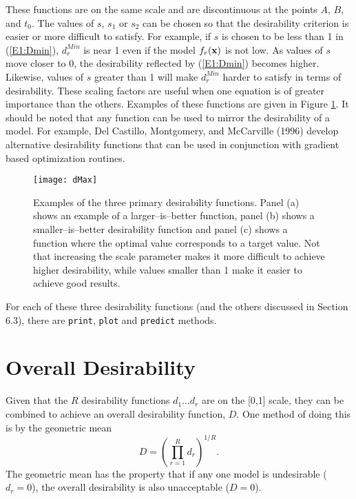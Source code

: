 \documentclass[12pt]{article}
\renewcommand{\vec}[1]{\mbox{\bf {#1}}}
\begin{document}
\noindent These functions are on the same scale and are discontinuous at the points $A$, $B$, and $t_0$. The values of $s$, $s_1$ or $s_2$ can be chosen so that the desirability criterion is easier or more difficult to satisfy. For example, if $s$ is chosen to be less than 1 in (\ref{E1:Dmin}), $d_r^{Min}$ is near 1 even if the model $f_r(\vec{x})$ is not low. As values of $s$ move closer to $0$, the desirability reflected by (\ref{E1:Dmin}) becomes higher. Likewise, values of $s$ greater than 1 will make $d_r^{Min}$ harder to satisfy in terms of desirability. These scaling factors are useful when one equation is of greater importance than the others. Examples of these functions are given in Figure \ref{F1:desire}. It should be noted that any function can be used to mirror the desirability of a model. For example, Del Castillo, Montgomery, and McCarville (1996) develop alternative desirability functions that can be used in conjunction with gradient based optimization routines.

\begin{figure}[p]
   \begin{center}	
      \texttt{[image: dMax]}  
      \caption{Examples of the three primary desirability functions. Panel (a) shows an example of a larger--is--better function, panel (b) shows a smaller--is--better desirability function and panel (c) shows a function where the optimal value corresponds to a target value. Not that increasing the scale parameter makes it more difficult to achieve higher desirability, while values smaller than 1 make it easier to achieve good results.}
      \label{F1:desire}            
   \end{center}
\end{figure}

For each of these three desirability functions (and the others discussed in Section 6.3), there are \texttt{print}, \texttt{plot} and \texttt{predict} methods.

\section{Overall Desirability}

 Given that the $R$ desirability functions $d_1 \ldots d_r$ are on the [0,1] scale, they can be combined to achieve an overall desirability function, $D$. One method of doing this is by the geometric mean
\[
D=\left(\prod_{r=1}^Rd_r\right)^{1/R}.
\]
The geometric mean has the property that if any one model is undesirable ($d_r=0$), the overall desirability is also unacceptable ($D=0$). 
\end{document}
